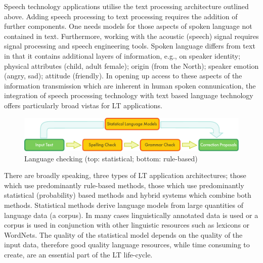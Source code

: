 \begin{multicols}{2}
Speech technology applications utilise the text processing architecture outlined above. Adding speech processing to text processing requires the addition of further components. One needs models for those aspects of spoken  language not contained in text. Furthermore, working with the acoustic (speech) signal requires signal processing and speech engineering tools. Spoken language differs from text in that it contains additional layers of information, e.g., on speaker identity; physical attributes (child, adult female); origin (from the North); speaker emotion (angry, sad); attitude (friendly). In opening up access to these aspects of the information transmission which are inherent in human spoken connunication, the integration of speech processing technology with text based language technology offers particularly broad vistas for LT applications.

\begin{figure}[hb]
  \center
  \includegraphics[width=\textwidth]{../_media/english/language_checking}
  \caption{Language checking (top: statistical; bottom: rule-based)}
  \label{fig:langcheckingaarch_en}
\end{figure}

There are broadly speaking, three types of LT application architectures; those which use predominantly rule-based methods, those which use predominantly statistical (probability) based methods and hybrid systems which combine both methods. Statistical methods derive language models from  large quantities of language data (a corpus). In many cases linguistically annotated data is used or a corpus is used in conjunction with other linguistic resources such as lexicons or WordNets. The quality of the statistical model depends on the quality of the input data, therefore good quality language resources, while time consuming to create, are an essential part of the LT life-cycle. 


\end{multicols}
